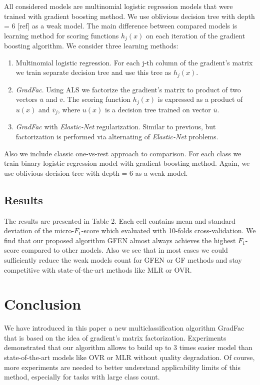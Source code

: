 \documentclass{article}
\begin{document}
All considered models are multinomial logistic regression models that were trained with gradient boosting method. We use oblivious decision tree with depth = 6 [ref] as a weak model. The main difference between compared models is learning method for scoring functions $h_{j}(x)$ on each iteration of the gradient boosting algorithm. We consider three learning methods:
\begin{enumerate}
	\item Multinomial logistic regression. For each j-th column of the gradient's matrix we train separate decision tree and use this tree as $h_{j}(x)$.

	\item \emph{GradFac}. Using ALS we factorize the gradient's matrix to product of two vectors $\overline{u}$ and $\overline{v}$. The scoring function $h_{j}(x)$ is expressed as a product of $u(x)$ and $\overline{v}_{j}$, where $u(x)$ is a decision tree trained on vector $\overline{u}$.

	\item \emph{GradFac} with \emph{Elastic-Net} regularization. Similar to previous, but factorization is performed via alternating of \emph{Elastic-Net} problems.
\end{enumerate}
Also we include classic one-vs-rest approach to comparison. For each class we train binary logistic regression model with gradient boosting method. Again, we use oblivious decision tree with depth = 6 as a  weak model.


\subsection{Results}
The results are presented in Table 2. Each cell contains mean and standard deviation of the micro-$F_1$-score which evaluated with 10-folds cross-validation. We find that our proposed algorithm GFEN almost always achieves the highest $F_1$-score compared to other models. Also we see that in most cases we could sufficiently reduce the weak models count for GFEN or GF methods and stay competitive with state-of-the-art methods like MLR or OVR.


\section{Conclusion}
We have introduced in this paper a new multiclassification algorithm GradFac that is based on the idea of gradient's matrix factorization. Experiments demonstrated that our algorithm allows to build up to 3 times easier model than state-of-the-art models like OVR or MLR without quality degradation. Of course, more experiments are needed to better understand applicability limits of this method, especially for tasks with large class count.
\end{document}
